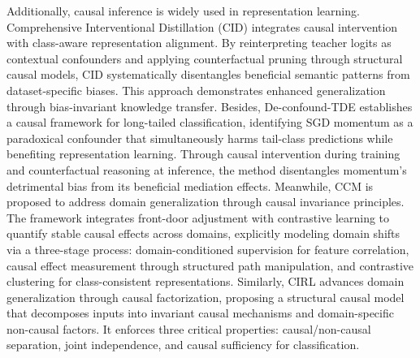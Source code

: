 Additionally, causal inference is widely used in representation learning. Comprehensive Interventional Distillation (CID) \cite{dengComprehensiveKnowledgeDistillation2021} integrates causal intervention with class-aware representation alignment. By reinterpreting teacher logits as contextual confounders and applying counterfactual pruning through structural causal models, CID systematically disentangles beneficial semantic patterns from dataset-specific biases. This approach demonstrates enhanced generalization through bias-invariant knowledge transfer. Besides, De-confound-TDE \cite{tangLongTailedClassificationKeeping2021} establishes a causal framework for long-tailed classification, identifying SGD momentum as a paradoxical confounder that simultaneously harms tail-class predictions while benefiting representation learning. Through causal intervention during training and counterfactual reasoning at inference, the method disentangles momentum’s detrimental bias from its beneficial mediation effects. Meanwhile, CCM \cite{miaoDomainGeneralizationContrastive2022} is proposed to address domain generalization through causal invariance principles. The framework integrates front-door adjustment with contrastive learning to quantify stable causal effects across domains, explicitly modeling domain shifts via a three-stage process: domain-conditioned supervision for feature correlation, causal effect measurement through structured path manipulation, and contrastive clustering for class-consistent representations. Similarly, CIRL \cite{lvCausalityInspiredRepresentation2022} advances domain generalization through causal factorization, proposing a structural causal model that decomposes inputs into invariant causal mechanisms and domain-specific non-causal factors. It enforces three critical properties: causal/non-causal separation, joint independence, and causal sufficiency for classification. 

